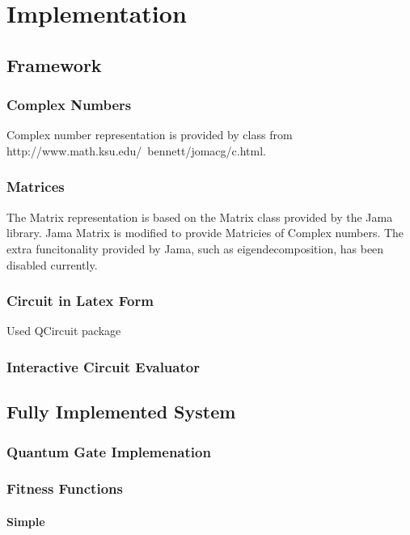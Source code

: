 \chapter{Implementation}

\section{Framework}
\subsection{Complex Numbers}
Complex number representation is provided by class from http://www.math.ksu.edu/~bennett/jomacg/c.html.

\subsection{Matrices}

The Matrix representation is based on the Matrix class provided by the Jama library.
Jama Matrix is modified to provide Matricies of Complex numbers.
The extra funcitonality provided by Jama, such as eigendecomposition, has been disabled currently.

\subsection{Circuit in Latex Form}
Used QCircuit package

\subsection{Interactive Circuit Evaluator}

\section{Fully Implemented System}
\subsection{Quantum Gate Implemenation}


\subsection{Fitness Functions}

\subsubsection{Simple}

